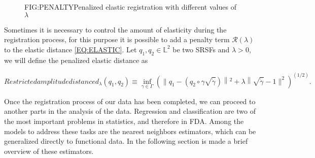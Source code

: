
\begin{figure}[Penalized elastic registration]{FIG:PENALTY}{Penalized elastic registration with different values of $\lambda$}
	 \quad
\end{figure}

Sometimes it is necessary to control the amount of elasticity during the
registration process, for this purpose it is possible to add a penalty term
$\mathcal{R}(\lambda)$ to the elastic distance \ref{EQ:ELASTIC}.
Let $q_1, q_2 \in \mathbb{L}^2$ be two SRSFs and $\lambda > 0$, we will define
the penalized elastic distance as

\begin{equation}[]{Restricted amplitude distance}
d_{\lambda}\left(q_{1}, q_{2}\right) \equiv \inf _{\gamma \in \Gamma}\left(
\| q_{1}-\left(q_{2} \circ \gamma \sqrt{\dot{\gamma}}\right)\left\|^{2}+
\lambda\right\| \sqrt{\dot{\gamma}}-1 \|^{2} \right)^{(1 / 2)}.
\end{equation}

Once the registration process of our data has been completed,
we can proceed to another parts in the analysis of the data.
Regression and classification are two of the most important problems in
statistics, and therefore in FDA.
Among the models to address these tasks are the nearest neighbors estimators,
which can be generalized directly to functional data. In the following section
is made a brief overview of these estimators.

